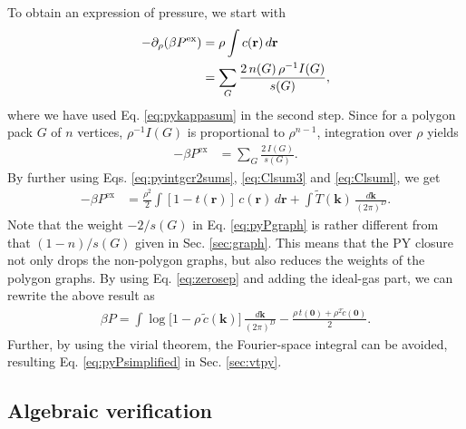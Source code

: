 \documentclass[preprint]{revtex4-1}
\newcommand{\vct}[1]{\mathbf{#1}}
\providecommand{\vr}{} %
\renewcommand{\vr}{\vct{r}}
\newcommand{\vk}{\vct{k}}
\newcommand{\dvk}{\frac{d\vk}{(2\pi)^D}}
\newcommand{\supex}[1]{ { { #1 }^{ \mathrm{ex} } } }
\newcommand{\Pex}{\supex{P}}
\begin{document}
%
To obtain an expression of pressure,
  we start with\cite{hansen}
%
\begin{align}
  -\partial_\rho (\beta \Pex)
  &= \rho \int c(\vr) \, d\vr
  \notag \\
  &= \sum_{G} \frac{ 2 \, n(G) \, \rho^{-1} I(G) }{ s(G) },
\label{eq:crcompr}
\end{align}
where
we have used Eq. \eqref{eq:pykappasum} in the second step.
%
%
Since for a polygon pack $G$ of $n$ vertices, $\rho^{-1} I(G)$
  is proportional to $\rho^{n-1}$,
%
integration over $\rho$ yields\cite{baxterpressure}
%
\begin{align}
      -\beta \Pex
  &=  \sum_{G} \frac{ 2 \, I(G) }{ s(G) }.
  \label{eq:pyPgraph}
\end{align}
%
By further using
Eqs. \eqref{eq:pyintgcr2sums}, \eqref{eq:Clsum3} and \eqref{eq:Clsuml},
we get
%
\begin{align}
      -\beta \Pex
  &=   \frac{ \rho^2 }{ 2 }
    \int [1 - t(\vr)]\, c(\vr) \, d\vr
      +\int \tilde{T}(\vk) \, \dvk.
\label{eq:baxterpressure}
\end{align}
%
Note that the weight $-2/s(G)$ in Eq. \eqref{eq:pyPgraph} is rather different
  from that $(1-n)/s(G)$ given in Sec. \ref{sec:graph}.
%
This means that the PY closure not only drops the non-polygon graphs,
  but also reduces the weights of the polygon graphs.
%
By using Eq. \eqref{eq:zerosep} and adding the ideal-gas part,
  we can rewrite the above result as
%
\begin{align*}
      \beta P
    =
      \int \log\big[1 - \rho \, \tilde{c}(\vk)\big] \, \dvk
      -\frac{ \rho \, t(\vct{0}) + \rho^2 \tilde{c}(\vct0) }{2}.
\end{align*}
%
Further, by using the virial theorem,
the Fourier-space integral can be avoided,
resulting Eq. \eqref{eq:pyPsimplified} in Sec. \ref{sec:vtpy}.



\subsection{Algebraic verification}
\end{document}
